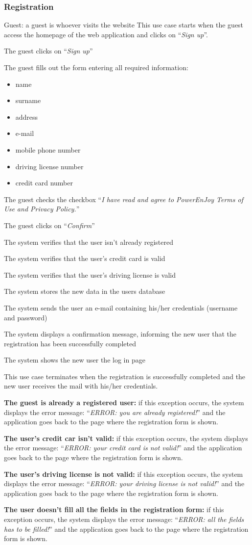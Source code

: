 \newcommand{\Event}[1]{
	\item #1
}

\newcommand{\Exc}[2]{
	\item \textbf{#1:} #2
	
}


\subsubsection{Registration}
\toggletrue{exception}
\begin{UseCase}
	{Guest: a guest is whoever visits the website}
	{This use case starts when the guest access the homepage of the web application and clicks on ``\textit{Sign up}''.}
	{
		\Event{The guest clicks on ``\textit{Sign up}''}
		\Event{The guest fills out the form entering all required information:
			\begin{itemize}
				\item name
				\item surname
				\item address
				\item e-mail
				\item mobile phone number
				\item driving license number
				\item credit card number
		\end{itemize}}
		\Event{The guest checks the checkbox ``\textit{I have read and agree to PowerEnJoy Terms of Use and Privacy Policy.}''}
		\Event{The guest clicks on ``\textit{Confirm}''}
		\Event{The system verifies that the user isn't already registered}
		\Event{The system verifies that the user's credit card is valid}
		\Event{The system verifies that the user's driving license is valid}
		\Event{The system stores the new data in the users database}
		\Event{The system sends the user an e-mail containing his/her credentials (username and password)}
		\Event{The system displays a confirmation message, informing the new user that the registration has been successfully completed}
		\Event{The system shows the new user the log in page}
	}
	{This use case terminates when the registration is successfully completed and the new user receives the mail with his/her credentials.}
	{
		\Exc{The guest is already a registered user}{if this exception occurs, the system displays the error message: ``\textit{ERROR: you are already registered!}'' and the application goes back to the page where the registration form is shown.}
		\Exc{The user's credit car isn't valid}{if this exception occurs, the system displays the error message: ``\textit{ERROR: your credit card is not valid!}'' and the application goes back to the page where the registration form is shown.}
		\Exc{The user's driving license is not valid}{if this exception occurs, the system displays the error message: ``\textit{ERROR: your driving license is not valid!}'' and the application goes back to the page where the registration form is shown.}
		\Exc{The user doesn't fill all the fields in the registration form}{if this exception occurs, the system displays the error message: ``\textit{ERROR: all the fields has to be filled!}'' and the application goes back to the page where the registration form is shown.}
	}
\end{UseCase}


